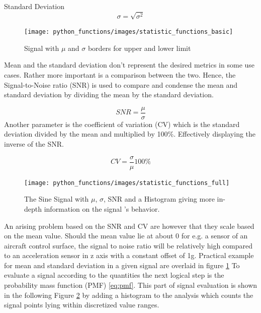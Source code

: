 Standard Deviation
\begin{equation}
    \label{eq:stdev_disc}
    \sigma = \sqrt{\sigma^2}
\end{equation}

\begin{figure}[h]
    \centering
    \texttt{[image: python\_functions/images/statistic\_functions\_basic]}
    \caption[Signal analysis with $\mu$ and $\sigma$]{Signal with $\mu$ and $\sigma$ borders for upper and lower limit}
    \label{fig:statistics_basic}
\end{figure}

Mean and the standard deviation don't represent the desired metrics in some use cases. Rather more important is a comparison between the two. Hence, the Signal-to-Noise ratio (SNR) is used to compare and condense the mean and standard deviation by dividing the mean by the standard deviation.

\begin{equation}
    \label{eq:snr}
    SNR=\frac{\mu}{\sigma}
\end{equation}
Another parameter is the coefficient of variation (CV) which is the standard deviation divided by the mean and multiplied by 100\%. Effectively displaying the inverse of the SNR.

\begin{equation}
    \label{eq:coeff_var}
    CV = \frac{\sigma}{\mu}100\%
\end{equation}

\begin{figure}[h]
    \centering
    \texttt{[image: python\_functions/images/statistic\_functions\_full]}
    \caption[Full Signal Analysis]{The Sine Signal with $\mu$, $\sigma$, SNR and a Histogram giving more in-depth information on the signal 's behavior.}
    \label{fig:statistics_full}
\end{figure}

An arising problem based on the SNR and CV are however that they scale based on the mean value. Should the mean value lie at about 0 for e.g. a sensor of an aircraft control surface, the signal to noise ratio will be relatively high compared to an acceleration sensor in z axis with a constant offset of 1g. Practical example for mean and standard deviation in a given signal are overlaid in figure \ref{fig:statistics_basic}
To evaluate a signal according to the quantities the next logical step is the probability mass function (PMF) \ref{eq:pmf}. This part of signal evaluation is shown in the following Figure \ref{fig:statistics_full} by adding a histogram to the analysis which counts the signal points lying within discretized value ranges.

